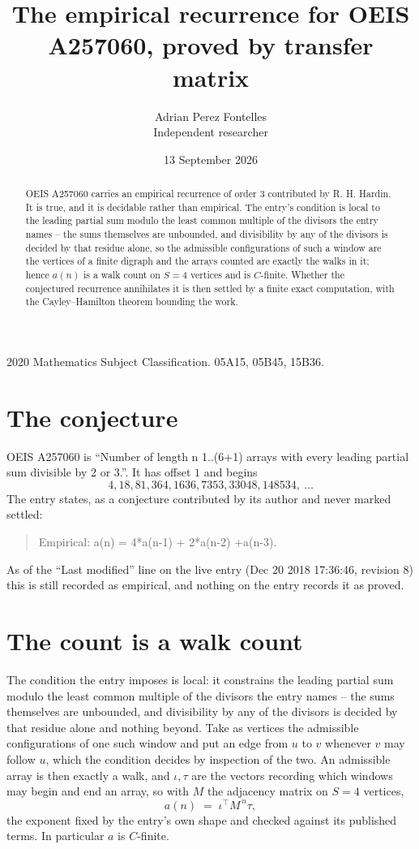 \documentclass[11pt,a4paper]{article}
\title{The empirical recurrence for OEIS A257060, proved by transfer matrix}
\author{Adrian Perez Fontelles\\ \small Independent researcher}
\date{13 September 2026}
\theoremstyle{plain}
\theoremstyle{definition}
\begin{document}
\maketitle

\begin{abstract}
OEIS A257060 carries an empirical recurrence of order $3$ contributed by R. H. Hardin. It is
true, and it is decidable rather than empirical. The entry's condition is local to the leading partial sum modulo the least common multiple of the divisors the entry names -- the sums themselves are unbounded, and divisibility by any of the divisors is decided by that residue alone, so
the admissible configurations of such a window are the vertices of a finite digraph and the
arrays counted are exactly the walks in it; hence $a(n)$ is a walk count on $S=4$ vertices
and is $C$-finite. Whether the conjectured recurrence annihilates it is then settled by a
finite exact computation, with the Cayley--Hamilton theorem bounding the work.
\end{abstract}

\noindent\small 2020 Mathematics Subject Classification. 05A15, 05B45, 15B36.\normalsize

\section{The conjecture}

OEIS A257060 is ``Number of length n 1..(6+1) arrays with every leading partial sum divisible by 2 or 3.''. It has offset $1$ and begins
\[
4, 18, 81, 364, 1636, 7353, 33048, 148534,\ \dots
\]
The entry states, as a conjecture contributed by its author and never marked settled:
\begin{quote}
Empirical: a(n) = 4*a(n-1) + 2*a(n-2) +a(n-3).
\end{quote}
As of the ``Last modified'' line on the live entry (Dec 20 2018 17:36:46, revision 8) this is still
recorded as empirical, and nothing on the entry records it as proved.

\section{The count is a walk count}

The condition the entry imposes is local: it constrains the leading partial sum modulo the least common multiple of the divisors the entry names -- the sums themselves are unbounded, and divisibility by any of the divisors is decided by that residue alone and nothing beyond. Take as vertices the admissible configurations of one such window and put an edge from $u$ to $v$ whenever $v$ may follow $u$, which the condition decides by inspection of the two.
An admissible array is then exactly a walk, and $\iota,\tau$ are the vectors recording which windows may begin and end an array, so with $M$ the adjacency matrix on $S=4$ vertices,
\[
a(n)\;=\;\iota^{\!\top}M^{\,n}\tau ,
\]
the exponent fixed by the entry's own shape and checked against its published terms. In
particular $a$ is $C$-finite.
\end{document}
